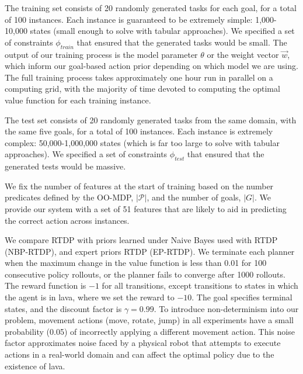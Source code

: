\documentclass[11pt]{article}
\begin{document}
The training set consists of 20 randomly generated tasks for each goal, for a total of 100 instances. Each instance is guaranteed to be extremely simple: 1,000-10,000 states (small enough to solve with tabular approaches). We specified a set of constraints $\phi_{train}$ that ensured that the generated tasks would be small. The output of our training process is the model parameter $\theta$ or the weight vector $\vec{w}$, which inform our goal-based action prior depending on which model we are using. The full training process takes approximately one hour run in parallel on a computing grid, with the majority of time devoted to computing the optimal value function for each training instance.

The test set consists of 20 randomly generated tasks from the same domain, with the same five goals, for a total of 100 instances. Each instance is extremely complex: 50,000-1,000,000 states (which is far too large to solve with tabular approaches). We specified a set of constraints $\phi_{test}$ that ensured that the generated tests would be massive.

We fix the number of features at the start of training based on the number
predicates defined by the OO-MDP, $|\mathcal{P}|$, and the number of goals, $|G|$.
We provide our system with a set of 51 features that are likely to aid in predicting the correct action across instances.

We compare RTDP with priors learned under Naive Bayes used with RTDP (NBP-RTDP), and expert priors RTDP (EP-RTDP).
We terminate each planner when the maximum change in
the value function is less than 0.01 for 100 consecutive policy
rollouts, or the planner fails to converge after 1000 rollouts.  The
reward function is $-1$ for all transitions, except transitions to
states in which the agent is in lava, where we set the reward to
$-10$. The goal specifies terminal states, and the discount factor is
$\gamma = 0.99$.  To introduce non-determinism into our problem,
movement actions (move, rotate, jump) in all experiments have a small
probability (0.05) of incorrectly applying a different movement
action.  This noise factor approximates noise faced by a physical
robot that attempts to execute actions in a real-world domain and
can affect the optimal policy due to the existence of lava.
\end{document}
